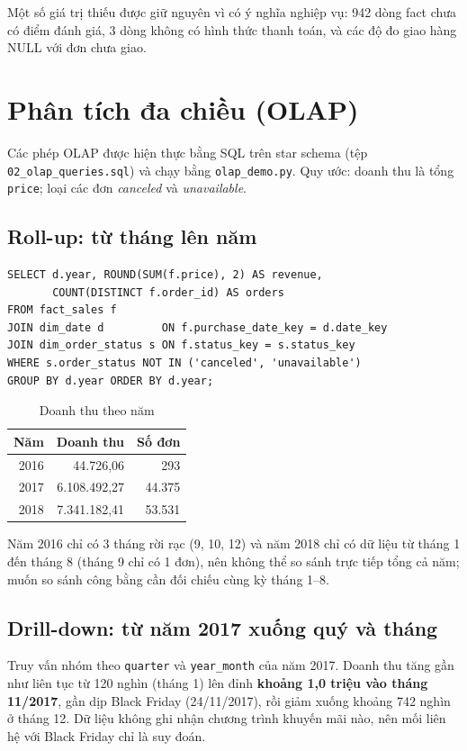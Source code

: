 \documentclass[12pt,a4paper]{article}
\newcommand{\code}[1]{\texttt{\small #1}}
\begin{document}
Một số giá trị thiếu được giữ nguyên vì có ý nghĩa nghiệp vụ: 942 dòng fact chưa có điểm đánh giá, 3 dòng không
có hình thức thanh toán, và các độ đo giao hàng NULL với đơn chưa giao.

\section{Phân tích đa chiều (OLAP)}

Các phép OLAP được hiện thực bằng SQL trên star schema (tệp \code{02\_olap\_queries.sql}) và chạy bằng
\code{olap\_demo.py}. Quy ước: doanh thu là tổng \code{price}; loại các đơn \emph{canceled} và \emph{unavailable}.

\subsection{Roll-up: từ tháng lên năm}
\begin{lstlisting}[style=sql]
SELECT d.year, ROUND(SUM(f.price), 2) AS revenue,
       COUNT(DISTINCT f.order_id) AS orders
FROM fact_sales f
JOIN dim_date d         ON f.purchase_date_key = d.date_key
JOIN dim_order_status s ON f.status_key = s.status_key
WHERE s.order_status NOT IN ('canceled', 'unavailable')
GROUP BY d.year ORDER BY d.year;
\end{lstlisting}

\begin{table}[h]
\centering
\caption{Doanh thu theo năm}
\small
\begin{tabular}{@{}r r r@{}}
\toprule
\textbf{Năm} & \textbf{Doanh thu} & \textbf{Số đơn}\\
\midrule
2016 & 44.726,06 & 293\\
2017 & 6.108.492,27 & 44.375\\
2018 & 7.341.182,41 & 53.531\\
\bottomrule
\end{tabular}
\end{table}

Năm 2016 chỉ có 3 tháng rời rạc (9, 10, 12) và năm 2018 chỉ có dữ liệu từ tháng 1 đến tháng 8 (tháng 9 chỉ có 1 đơn), nên không thể so sánh trực tiếp tổng cả năm; muốn so sánh công bằng cần đối chiếu cùng kỳ tháng 1--8.

\subsection{Drill-down: từ năm 2017 xuống quý và tháng}
Truy vấn nhóm theo \code{quarter} và \code{year\_month} của năm 2017. Doanh thu tăng gần như liên tục từ
120 nghìn (tháng 1) lên đỉnh \textbf{khoảng 1,0 triệu vào tháng 11/2017}, gần dịp Black Friday (24/11/2017), rồi giảm xuống khoảng 742 nghìn ở tháng 12. Dữ liệu không ghi nhận
chương trình khuyến mãi nào, nên mối liên hệ với Black Friday chỉ là suy đoán.
\end{document}

